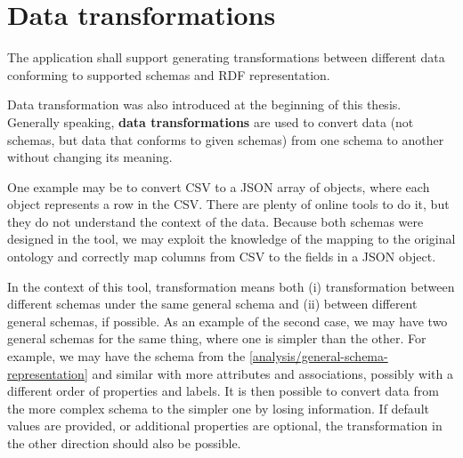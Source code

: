 \section{Data transformations}

\begin{requirement}
    The application shall support generating transformations between different data conforming to supported schemas and RDF representation.
\end{requirement}

Data transformation was also introduced at the beginning of this thesis. Generally speaking, \textbf{data transformations} are used to convert data (not schemas, but data that conforms to given schemas) from one schema to another without changing its meaning.

One example may be to convert CSV to a JSON array of objects, where each object represents a row in the CSV. There are plenty of online tools to do it, but they do not understand the context of the data. Because both schemas were designed in the tool, we may exploit the knowledge of the mapping to the original ontology and correctly map columns from CSV to the fields in a JSON object.

In the context of this tool, transformation means both (i) transformation between different schemas under the same general schema and (ii) between different general schemas, if possible. As an example of the second case, we may have two general schemas for the same thing, where one is simpler than the other. For example, we may have the schema from the \autoref{analysis/general-schema-representation} and similar with more attributes and associations, possibly with a different order of properties and labels. It is then possible to convert data from the more complex schema to the simpler one by losing information. If default values are provided, or additional properties are optional, the transformation in the other direction should also be possible.

\medskip

